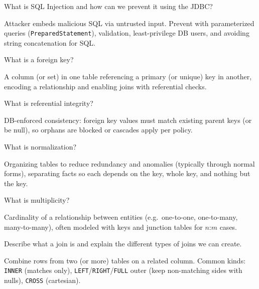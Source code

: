 \question[4]
What is SQL Injection and how can we prevent it using the JDBC?
\makeemptybox{1.45in}
\begin{solution}
  Attacker embeds malicious SQL via untrusted input. Prevent with parameterized queries (\texttt{PreparedStatement}), validation, least-privilege DB users, and avoiding string concatenation for SQL.
\end{solution}

\newpage


\question[4]
What is a foreign key?
\makeemptybox{1.1in}
\begin{solution}
  A column (or set) in one table referencing a primary (or unique) key in another, encoding a relationship and enabling joins with referential checks.
\end{solution}

\question[4]
What is referential integrity?
\makeemptybox{1.15in}
\begin{solution}
  DB-enforced consistency: foreign key values must match existing parent keys (or be null), so orphans are blocked or cascades apply per policy.
\end{solution}

\question[4]
What is normalization?
\makeemptybox{1.35in}
\begin{solution}
  Organizing tables to reduce redundancy and anomalies (typically through normal forms), separating facts so each depends on the key, whole key, and nothing but the key.
\end{solution}

\question[4]
What is multiplicity?
\makeemptybox{1.2in}
\begin{solution}
  Cardinality of a relationship between entities (e.g.\ one-to-one, one-to-many, many-to-many), often modeled with keys and junction tables for $n$:$m$ cases.
\end{solution}

\newpage


\question[4]
Describe what a join is and explain the different types of joins we can create.
\makeemptybox{1.65in}
\begin{solution}
  Combine rows from two (or more) tables on a related column. Common kinds: \texttt{INNER} (matches only), \texttt{LEFT}/\texttt{RIGHT}/\texttt{FULL} outer (keep non-matching sides with nulls), \texttt{CROSS} (cartesian).
\end{solution}

